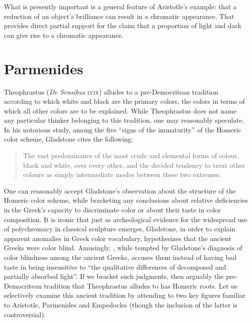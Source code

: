 What is presently important is a general feature of Aristotle's example: that a reduction of an object's brilliance can result in a chromatic appearance. That provides direct partial support for the claim that a proportion of light and dark can give rise to a chromatic appearance.


\section{Parmenides} %
\label{sec:parmenides}
Theophrastus (\emph{De Sensibus} \textsc{lvix}) alludes to a pre-Democritean tradition according to which white and black are the primary colors, the colors in terms of which all other colors are to be explained. While Theophrastus does not name any particular thinker belonging to this tradition, one may reasonably speculate. In his notorious study, among the five ``signs of the immaturity'' of the Homeric color scheme, Gladstone cites the following:  
\begin{quote}
    The vast predominance of the most crude and elemental forms of colour, black and white, over every other, and the decided tendency to treat other colours as simply intermediate modes between these two extremes. \citep[458]{Gladstone:1858fk}
\end{quote}
One can reasonably accept Gladstone's observation about the structure of the Ho\-meric color scheme, while bracketing any conclusions about relative deficiencies in the Greek's capacity to discriminate color or about their taste in color composition. It is ironic that just as archeological evidence for the widespread use of polychromacy in classical sculpture emerges, Gladstone, in order to explain apparent anomalies in Greek color vocabulary, hypothesizes that the ancient Greeks were color blind. Amusingly, \citealt[162]{Platnauer:1921bh}, while tempted by Gladstone's diagnosis of color blindness among the ancient Greeks, accuses them instead of having bad taste in being insensitive to ``the qualitative differences of decomposed and partially absorbed light''. If we bracket such judgments, then arguably the pre-De\-mo\-cri\-tean tradition that Theophrastus alludes to has Homeric roots. Let us selectively examine this ancient tradition by attending to two key figures familiar to Aristotle, Parmenides and Empedocles (though the inclusion of the latter is controversial).

